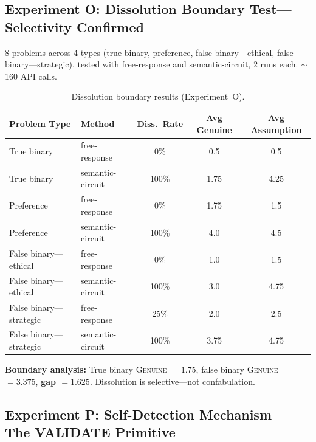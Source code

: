 \documentclass[11pt,a4paper]{article}
\begin{document}
\subsection{Experiment O: Dissolution Boundary Test---Selectivity Confirmed}
\label{sec:boundary}

8 problems across 4 types (true binary, preference, false binary---ethical, false binary---strategic), tested with free-response and semantic-circuit, 2 runs each. $\sim$160 API calls.

\begin{table}[H]
\centering
\caption{Dissolution boundary results (Experiment~O).}
\small
\begin{tabular}{llccc}
\toprule
\textbf{Problem Type} & \textbf{Method} & \textbf{Diss.\ Rate} & \textbf{Avg Genuine} & \textbf{Avg Assumption} \\
\midrule
True binary         & free-response     & 0\%   & 0.5  & 0.5 \\
True binary         & semantic-circuit  & 100\% & 1.75 & 4.25 \\
Preference          & free-response     & 0\%   & 1.75 & 1.5 \\
Preference          & semantic-circuit  & 100\% & 4.0  & 4.5 \\
False binary---ethical  & free-response & 0\%   & 1.0  & 1.5 \\
False binary---ethical  & semantic-circuit & 100\% & 3.0 & 4.75 \\
False binary---strategic & free-response & 25\% & 2.0  & 2.5 \\
False binary---strategic & semantic-circuit & 100\% & 3.75 & 4.75 \\
\bottomrule
\end{tabular}
\label{tab:boundary}
\end{table}

\textbf{Boundary analysis:} True binary \textsc{Genuine} $= 1.75$, false binary \textsc{Genuine} $= 3.375$, \textbf{gap $= 1.625$}. Dissolution is selective---not confabulation.

\subsection{Experiment P: Self-Detection Mechanism---The VALIDATE Primitive}
\label{sec:validate}
\end{document}
